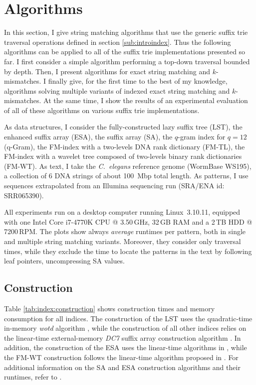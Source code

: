 \section{Algorithms}
\label{sec:index:algo}

In this section, I give string matching algorithms that use the generic suffix trie traversal operations defined in section \ref{sub:introindex}.
Thus the following algorithms can be applied to all of the suffix trie implementations presented so far.
I first consider a simple algorithm performing a top-down traversal bounded by depth.
Then, I present algorithms for exact string matching and $k$-mismatches. %
I finally give, for the first time to the best of my knowledge, algorithms solving multiple variants of indexed exact string matching and $k$-mismatches.
At the same time, I show the results of an experimental evaluation of all of these algorithms on various suffix trie implementations.

As data structures, I consider the fully-constructed lazy suffix tree (LST), the enhanced suffix array (ESA), the suffix array (SA), the $q$-gram index for $q=12$ (q-Gram), the FM-index with a two-levels DNA rank dictionary (FM-TL), the FM-index with a wavelet tree composed of two-levels binary rank dictionaries (FM-WT).
As text, I take the \emph{C.~elegans} reference genome (WormBase WS195), \ie a collection of 6 DNA strings of about 100~Mbp total length.
As patterns, I use sequences extrapolated from an Illumina sequencing run (SRA/ENA id: SRR065390).

All experiments run on a desktop computer running Linux~3.10.11, equipped with one Intel\textsuperscript{\textregistered} Core i7-4770K CPU @ 3.50\,GHz, 32\,GB RAM and a 2\,TB HDD @ 7200\,RPM.
The plots show always \emph{average} runtimes per pattern, both in single and multiple string matching variants.
Moreover, they consider only traversal times, while they exclude the time to locate the patterns in the text by following leaf pointers, \eg uncompressing SA values.

\subsection{Construction}
\label{sec:index:algo:construction}

Table \ref{tab:index:construction} shows construction times and memory consumption for all indices.
The construction of the LST uses the quadratic-time in-memory \emph{wotd} algorithm \citep{Giegerich1999}, while the construction of all other indices relies on the linear-time external-memory \emph{DC7} suffix array construction algorithm \citep{Dementiev2008}.
In addition, the construction of the ESA uses the linear-time algorithms in \citep{Kasai2001,Abouelhoda2004}, while the FM-WT construction follows the linear-time algorithm proposed in \citep{Grossi2003}.
For additional information on the SA and ESA construction algorithms and their runtimes, refer to \citep{Weese2013}.

